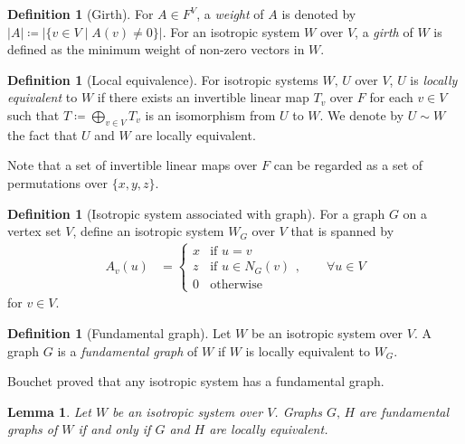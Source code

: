 \documentclass[twoside,10pt]{article}
\newtheorem{lemma}[theorem]{Lemma}
\theoremstyle{definition}
\newtheorem{definition}[theorem]{Definition}
\theoremstyle{remark}
\begin{document}
\begin{definition}[Girth]
For $A\in F^V$, a \textit{weight} of $A$ is denoted by $|A|\coloneqq|\{v\in V\mid A(v)\ne 0\}|$.
For an isotropic system $W$ over $V$, a \textit{girth} of $W$ is defined as the minimum weight of non-zero vectors in $W$.
\end{definition}

\begin{definition}[Local equivalence]
For isotropic systems $W,\,U$ over $V$, $U$ is \textit{locally equivalent} to $W$ if there exists an invertible linear map $T_v$ over $F$ for each $v\in V$ such that $T\coloneqq \bigoplus_{v\in V}T_v$ is an isomorphism from $U$ to $W$.
We denote by $U\sim W$ the fact that $U$ and $W$ are locally equivalent.
\end{definition}
Note that a set of invertible linear maps over $F$ can be regarded as a set of permutations over $\{x,y,z\}$.

\begin{definition}[Isotropic system associated with graph]
For a graph $G$ on a vertex set $V$, define an isotropic system $W_G$ over $V$ that is spanned by
\begin{align*}
A_v(u) &=
\begin{cases}
 x& \text{if } u = v\\
 z& \text{if } u\in N_G(v)\\
 0& \text{otherwise}
\end{cases},\qquad \forall u\in V
\end{align*}
for $v\in V$.
\end{definition}

\begin{definition}[Fundamental graph]
Let $W$ be an isotropic system over $V$.
A graph $G$ is a \textit{fundamental graph} of $W$ if $W$ is locally equivalent to $W_G$.
\end{definition}

Bouchet proved that any isotropic system has a fundamental graph.

\begin{lemma}
Let $W$ be an isotropic system over $V$.
Graphs $G,\,H$ are fundamental graphs of $W$ if and only if $G$ and $H$ are locally equivalent.
\end{lemma}
\end{document}
